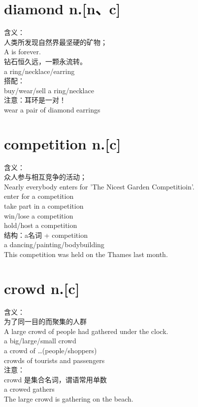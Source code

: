 \documentclass[twocolumn]{ctexbook}
\newcommand{\phrase}[1]{{\colorbox{yellow!40}{#1}}}
\newcommand{\point}[1]{{\color{red}#1}}
\newcommand{\word}[1]{{\em\color{black}{#1}}}
\begin{document}
	\section{diamond n.[n、c]}
	含义：\\
	人类所发现自然界最坚硬的矿物；\\
	A {\word{diamond}} is forever.\\
	钻石恒久远，一颗永流转。\\
	a {\word{diamond}}ring/necklace/earring\\
	搭配：\\
	buy/wear/sell a \word{diamond} ring/necklace\\
	注意：耳环是一对！\\
	wear a pair of diamond earrings\\
	\section{competition n.[c]}
	含义：\\
	众人参与相互竞争的活动；\\
	Nearly everybody enters for 'The Nicest Garden Competitioin'.\\
	\phrase{enter for a competition}\\
	\phrase{take part in a competition}\\
	\phrase{win/lose a competition}\\
	\phrase{hold/host a competition}\\
	结构：a名词 + competition \\
	\phrase{a dancing/painting/bodybuilding \word{competition}}\\
	This competition was held on the Thames last month.\\
	\section{crowd n.[c]}
	含义：\\
	为了\point{同一目的}而\point{聚集}的人群\\
	A large crowd of people had gathered under the clock.\\
	\phrase{a big/large/small crowd}\\
	\phrase{a crowd of \ldots (people/shoppers)}\\
	crowd\point{s} of tourists and passengers\\
	注意：\\
	crowd 是集合名词，谓语常用\point{单数}\\
	\phrase{a crowed gathers}\\
	The large crowd is gathering on the beach.\\
\end{document}
